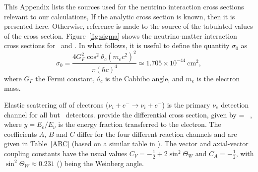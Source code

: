This Appendix lists the sources used for the neutrino
interaction cross sections relevant to our calculations, 
If the analytic cross section is known, then it is presented here.
Otherwise, reference is made to the source of the tabulated values of
the cross section.  
Figure~\ref{fig:sigma} shows the neutrino-matter interaction
cross sections for \nue\ and \anue.
In what follows, it is useful to
define the quantity $\sigma_0$ as
\begin{equation}
\sigma_0 = \frac{4G_F^2\cos^2{\theta_c}(m_ec^2)^2}{\pi(\hbar c)^4}
\simeq 1.705 \times 10^{-44}~\textrm{cm}^2,
\end{equation}
where $G_F$ the Fermi constant, 
 $\theta_c$ is the Cabbibo angle, and $m_e$ is the electron mass. 




Elastic scattering off of electrons ($\nu_i + e^- \rightarrow \nu_i +
e^-$)  is the primary $\nu_e$ detection channel for all but
\ detectors. \cite{tomasetal2003} provide the
differential cross section, given by
%
\beq   \label{el}
  = 
   ~,
\eeq         
%
where $y=E_e/E_\nu$ is the energy fraction transferred to the electron.  The
coefficients $A$, $B$ and $C$ differ for the four different reaction
channels and are given in Table~\ref{ABC} (based on a similar table in
\citealt{tomasetal2003}). The vector and axial-vector
coupling constants have the usual values $C_V
=-\frac{1}{2}+2\sin^2\Theta_W$ and $C_A=-\frac{1}{2}$, with
$\sin^2\Theta_W \approx 0.231$ (\citealt{oliveetal2014}) being the Weinberg angle.


